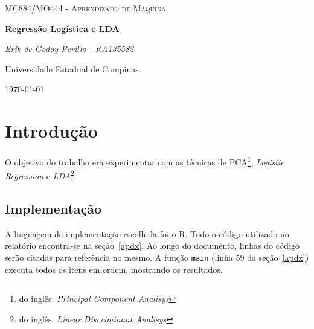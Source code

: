 \documentclass[10pt]{article}
\newcommand{\fromeng}[1]{\footnote{do inglês: \textit{#1}}}
\newcommand{\tit}[1]{\textit{#1}}
\newcommand{\ttt}[1]{\texttt{#1}}
\begin{document}
\begin{titlepage}
	\centering
	{\scshape\Large MC884/MO444 - Aprendizado de Máquina\par}
	\vspace{1.5cm}
	{\huge\bfseries Regressão Logística e LDA\par}
	\vspace{1cm}
	{\itshape Erik de Godoy Perillo - RA135582\par}
	\vfill
	Universidade Estadual de Campinas 
	\vfill
	{\large \today\par}
\end{titlepage}

\newpage

\section{Introdução}
O objetivo do trabalho era experimentar com as técnicas de 
PCA\fromeng{Principal Component Analisys}, \tit{Logistic Regression} e 
\tit{LDA}\fromeng{Linear Discriminant Analisys}. 

\subsection{Implementação}
A linguagem de implementação escolhida foi o R.
Todo o código utilizado no relatório encontra-se na seção~\ref{apdx}.
Ao longo do documento, linhas do código serão citadas para referência no mesmo.
A função \ttt{main} (linha 59 da seção~\ref{apdx}) executa todos os itens em
ordem, mostrando os resultados.
\end{document}
